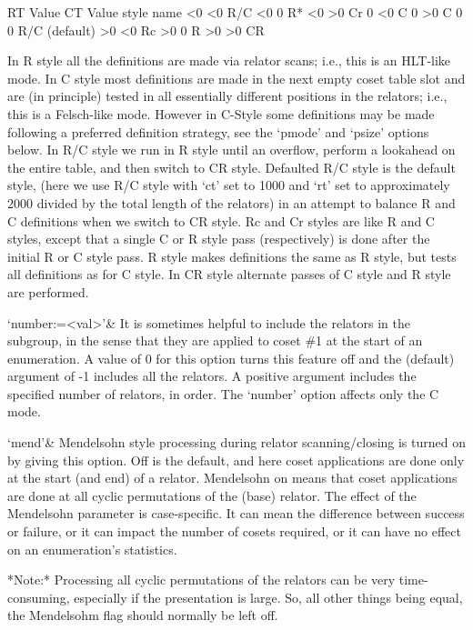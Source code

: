 \begintt
RT Value        CT Value        style name
<0              <0              R/C
<0              0               R*
<0              >0              Cr
0               <0              C
0               >0              C
0               0               R/C (default)
>0              <0              Rc
>0              0               R
>0              >0              CR
\endtt

In R style all the definitions are made via relator scans; i.e., this is 
an HLT-like
mode.  In C style most definitions are made in the next empty coset table
slot and are (in principle) tested in all essentially different positions in
the relators; i.e., this is a Felsch-like mode.
However in C-Style some definitions may be made following a preferred
definition strategy, see the `pmode' and `psize' options below.
In R/C style we run in R style until an overflow,
perform a lookahead on the entire table, and then switch to CR style.
Defaulted R/C style is the default style, (here we use R/C style with
`ct' set to 1000 and `rt' set to approximately $2000$ divided by the total
length of the relators) in an attempt to balance R and C definitions when
we switch to CR style.  Rc and Cr styles are like R and C styles, except
that a single C or R style pass (respectively) is done after the initial R
or C style pass.  R\* style makes definitions the same as R style, but tests
all definitions as for C style.  In CR style alternate passes of C style and
R style are performed.

\beginitems
`number:=<val>'&
It is sometimes helpful to include the relators in the subgroup, in the
sense that they are applied to coset \#1 at the start of an enumeration.  A
value of 0 for this option  turns this feature off and the (default) 
argument of -1
includes all the relators.  A positive argument includes the specified
number of relators, in order.
The `number' option affects only the C mode.

`mend'&
Mendelsohn style processing during relator scanning/closing is turned on by
giving this option.  Off is the default, and here coset applications are
done only at the start (and end) of a relator.  Mendelsohn on means that
coset applications are done at all cyclic permutations of the (base)
relator.  The effect of the Mendelsohn parameter is case-specific.  It can
mean the difference between success or failure, or it can impact the number
of cosets required, or it can have no effect on an enumeration's statistics.

*Note:* Processing all cyclic permutations of the relators can be very
time-consuming, especially if the presentation is large.  So, all other
things being equal, the Mendelsohm flag should normally be left off. 

